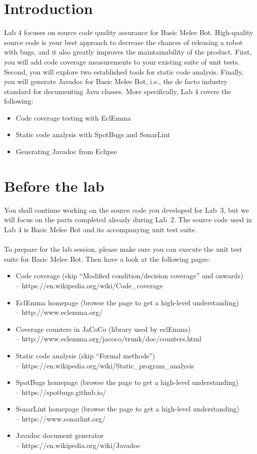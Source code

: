 \documentclass{scrreprt}
\begin{document}
\chapter{Introduction}
Lab 4 focuses on source code quality assurance for Basic Melee Bot. High-quality source code is your best approach to decrease the chances of releasing a robot with bugs, and it also greatly improves the maintainability of the product. First, you will add code coverage measurements to your existing suite of unit tests. Second, you will explore two established tools for static code analysis. Finally, you will generate Javadoc for Basic Melee Bot, i.e., the de facto industry standard for documenting Java classes. More specifically, Lab 4 covers the following:

\begin{itemize}
\item Code coverage testing with EclEmma
\item Static code analysis with SpotBugs and SonarLint
\item Generating Javadoc from Eclipse
\end{itemize}

\chapter{Before the lab}
You shall continue working on the source code you developed for Lab~3, but we will focus on the parts completed already during Lab~2. The source code used in Lab 4 is Basic Melee Bot and its accompanying unit test suite.\\\\
To prepare for the lab session, please make sure you can execute the unit test suite for Basic Melee Bot. Then have a look at the following pages:
\begin{itemize}
\item Code coverage (skip ``Modified condition/decision coverage'' and onwards)\\-- https://en.wikipedia.org/wiki/Code_coverage
\item EclEmma homepage (browse the page to get a high-level understanding) \\-- http://www.eclemma.org/
\item Coverage counters in JaCoCo (library used by eclEmma) \\-- http://www.eclemma.org/jacoco/trunk/doc/counters.html
\item Static code analysis (skip ``Formal methods'') \\-- https://en.wikipedia.org/wiki/Static_program_analysis
\item SpotBugs homepage (browse the page to get a high-level understanding) \\-- https://spotbugs.github.io/
\item SonarLint homepage (browse the page to get a high-level understanding) \\-- https://www.sonarlint.org/
\item Javadoc document generator \\-- https://en.wikipedia.org/wiki/Javadoc
\end{itemize}
\end{document}
